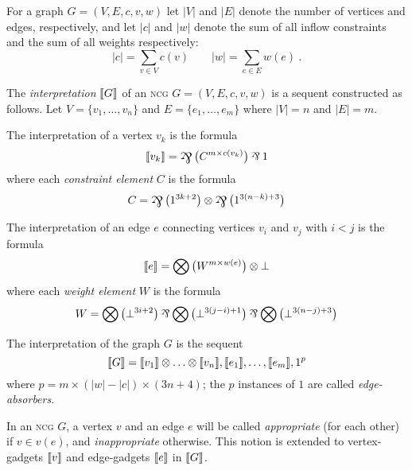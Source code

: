 \documentclass[conference]{IEEEtran}
\begin{document}
For a graph $G=(V,E,c,v,w)$ let $|V|$ and $|E|$ denote the number of vertices and edges, respectively, and let $|c|$ and $|w|$ denote the sum of all inflow constraints and the sum of all weights respectively:
\[
	|c| = \sum_{v\in V}c(v) \qquad |w| = \sum_{e\in E}w(e)~.
\]



\begin{definition}
\label{def:graph interpretation}
The \emph{interpretation} $\llbracket G\rrbracket$ of an \textsc{ncg} $G=(V,E,c,v,w)$ is a sequent constructed as follows.
%
Let $V=\{v_1,\dotsc,v_n\}$ and $E=\{e_1,\dotsc,e_m\}$ where $|V|=n$ and $|E|=m$.

The interpretation of a vertex $v_k$ is the formula
\[
	\itn{v_k} = \bigparr\big(C^{m\times c(v_k)} \big)\parr 1
\]
where each \emph{constraint element} $C$ is the formula
\[
	C = \bigparr\big(1^{3k+2}\big) \tn \bigparr\big(1^{3(n-k)+3}\big)
\]

The interpretation of an edge $e$ connecting vertices $v_i$ and $v_j$ with $i<j$ is the formula
\[
	\llbracket e\rrbracket = \bigotimes\big(W^{m\times w(e)}\big)\otimes\bot
\]
where each \emph{weight element} $W$ is the formula
\[
	W = \bigotimes\big(\bot^{3i+2}\big)\parr\bigotimes\big(\bot^{3(j-i)+1}\big)\parr\bigotimes\big(\bot^{3(n-j)+3}\big)
\]

The interpretation of the graph $G$ is the sequent
\[
	\llbracket G\rrbracket = \llbracket v_1\rrbracket\otimes\dotso\otimes\llbracket v_n\rrbracket, \llbracket e_1\rrbracket,\dotsc,\llbracket e_m\rrbracket, 1^p
\]
where $p=m\times(|w|-|c|)\times(3n+4)$; the $p$ instances of $1$ are called \emph{edge-absorbers}.

\end{definition}



In an \textsc{ncg} $G$, a vertex $v$ and an edge $e$ will be called \emph{appropriate} (for each other) if $v\in v(e)$, and \emph{inappropriate} otherwise.
%
This notion is extended to vertex-gadgets $\llbracket v\rrbracket$ and edge-gadgets $\llbracket e\rrbracket$ in $\llbracket G\rrbracket$.
\end{document}
